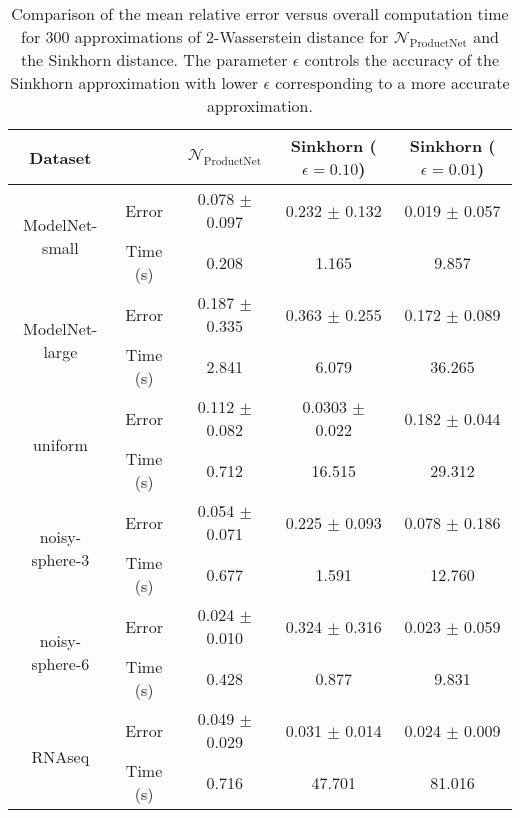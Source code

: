 \documentclass[12pt]{article}
\newcommand{\Network}{\mathcal{N}_{\mathrm{ProductNet}}}
\begin{document}
\begin{table}[]
    \centering
    \caption{Comparison of the mean relative error versus overall computation time for 300 approximations of 2-Wasserstein distance for $\Network$ and the Sinkhorn distance. The parameter $\epsilon$ controls the accuracy of the Sinkhorn approximation with lower $\epsilon$ corresponding to a more accurate approximation.}
    \begin{tabular}{ccccc}
    \hline
        Dataset & &$\Network$ & Sinkhorn ($\epsilon =0.10$) & Sinkhorn ($\epsilon=0.01$) \\
        \hline
         \multirow{2}{*}{{\small ModelNet-small}} & Error & 0.078 $\pm$ 0.097 & 0.232 $\pm$ 0.132 & 0.019 $\pm$ 0.057\\
         & Time (s) & 0.208 & 1.165 & 9.857\\
         \hline
         \multirow{2}{*}{{\small ModelNet-large}} & Error & 0.187 $\pm$ 0.335 & 0.363 $\pm$ 0.255 & 0.172 $\pm$ 0.089\\
         & Time (s) & 2.841 & 6.079 & 36.265\\
         \hline
         \multirow{2}{*}{{\small uniform}} & Error & 0.112 $\pm$ 0.082 & 0.0303 $\pm$ 0.022 & 0.182 $\pm$ 0.044 \\
         & Time (s) & 0.712 & 16.515 & 29.312 \\
         \hline
         \multirow{2}{*}{noisy-sphere-3} & Error & 0.054 $\pm$ 0.071 & 0.225 $\pm$ 0.093 & 0.078 $\pm$ 0.186\\
         & Time (s) & 0.677 & 1.591 & 12.760\\
         \hline
         \multirow{2}{*}{noisy-sphere-6} & Error & 0.024 $\pm$ 0.010 & 0.324 $\pm$ 0.316 & 0.023 $\pm$ 0.059\\
         & Time (s) & 0.428 & 0.877 & 9.831\\
         \hline
         \multirow{2}{*}{{\small RNAseq }} & Error & 0.049 $\pm$ 0.029 & 0.031 $\pm$ 0.014 & 0.024 $\pm$ 0.009 \\
         & Time (s) & 0.716 & 47.701 & 81.016 \\
         \hline
    \end{tabular}
    \label{tab:w2-computation-time}
\end{table}
\end{document}
